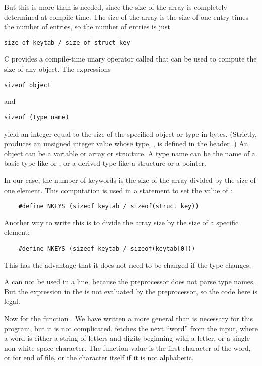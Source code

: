 But this is more than is needed, since the size of the array is completely determined at compile time.
The size of the array is the size of one entry times the number of entries, so the number of entries is just
\begin{lstlisting}[basicstyle=\ttfamily\normalsize\itshape, keywordstyle=\color{black}]
	size of keytab / size of struct key
\end{lstlisting}
C provides a compile-time unary operator called  that can be used to compute the size of any object.
The expressions
\begin{lstlisting}[basicstyle=\ttfamily\normalsize\itshape, keywordstyle=\color{black}]
	sizeof object
\end{lstlisting}
and
\begin{lstlisting}[basicstyle=\ttfamily\normalsize\itshape, keywordstyle=\color{black}]
	sizeof (type name)
\end{lstlisting}
yield an integer equal to the size of the specified object or type in bytes.
(Strictly,  produces an unsigned integer value whose type, , is defined in the header .)
An object can be a variable or array or structure.
A type name can be the name of a basic type like  or , or a derived type like a structure or a pointer.

In our case, the number of keywords is the size of the array divided by the size of one element.
This computation is used in a  statement to set the value of :
\begin{lstlisting}
	#define NKEYS (sizeof keytab / sizeof(struct key))
\end{lstlisting}
Another way to write this is to divide the array size by the size of a specific element:
\begin{lstlisting}
	#define NKEYS (sizeof keytab / sizeof(keytab[0]))
\end{lstlisting}
This has the advantage that it does not need to be changed if the type changes.

A  can not be used in a  line, because the preprocessor does not parse type names.
But the expression in the  is not evaluated by the preprocessor, so the code here is legal.

Now for the function .
We have written a more general  than is necessary for this program, but it is not complicated.
 fetches the next ``word'' from the input, where a word is either a string of letters and digits beginning with a letter, or a single non-white space character.
The function value is the first character of the word, or  for end of file, or the character itself if it is not alphabetic.

